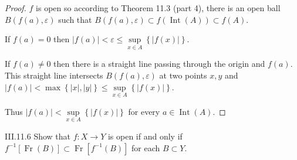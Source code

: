 \begin{proof}
    \( f \) is open so according to Theorem 11.3 (part 4), there is an open ball \( B(f(a), \varepsilon) \) such that \( B(f(a), \varepsilon) \subset f(\operatorname{Int}(A)) \subset f(A) \).

    If \( f(a) = 0 \) then \( \left\vert f(a) \right\vert < \varepsilon \le \sup\limits_{x\in A}\left\{ \left\vert f(x) \right\vert \right\} \).

    If \( f(a) \ne 0 \) then there is a straight line passing through the origin and \( f(a) \). This straight line intersects \( B(f(a), \varepsilon) \) at two points \( x, y \) and \( \left\vert f(a) \right\vert < \max\left\{ \left\vert x \right\vert, \left\vert y \right\vert \right\} \le \sup\limits_{x\in A}\left\{ \left\vert f(x) \right\vert \right\} \).

    Thus \( \left\vert f(a) \right\vert < \sup\limits_{x\in A}\left\{ \left\vert f(x) \right\vert \right\} \) for every \( a \in \operatorname{Int}(A) \).
\end{proof}

\begin{problem}{III.11.6}
Show that \( f: X \to Y \) is open if and only if \( f^{-1}\left\lbrack \operatorname{Fr}(B) \right\rbrack \subset \operatorname{Fr}\left\lbrack f^{-1}(B) \right\rbrack \) for each \( B \subset Y \).
\end{problem}

